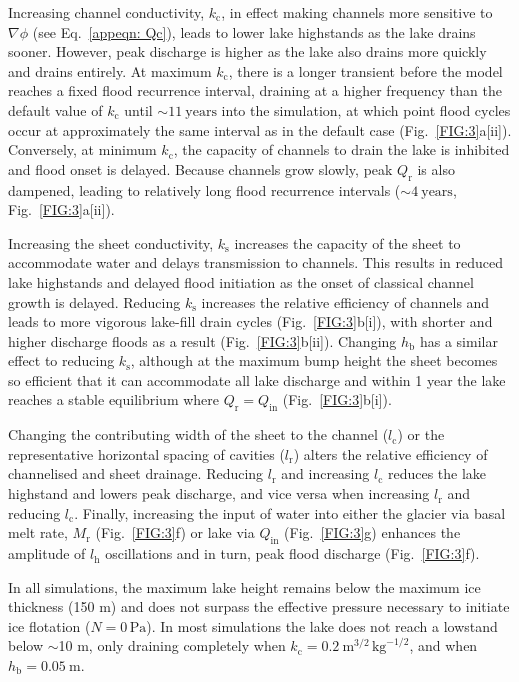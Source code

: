 \documentclass[tc, manuscript]{copernicus}
\begin{document}
Increasing channel conductivity, $k_{\mathrm{c}}$, in effect making channels more sensitive to $\nabla \phi$ (see Eq.~\ref{appeqn: Qc}), leads to lower lake highstands as the lake drains sooner. However, peak discharge is higher as the lake also drains more quickly and drains entirely. At maximum $k_{\mathrm{c}}$, there is a longer transient before the model reaches a fixed flood recurrence interval, draining at a higher frequency than the default value of $k_{\mathrm{c}}$ until $\sim 11 \ \mathrm{years}$ into the simulation, at which point flood cycles occur at approximately the same interval as in the default case (Fig.~\ref{FIG:3}a[ii]). Conversely, at minimum $k_{\mathrm{c}}$, the capacity of channels to drain the lake is inhibited and flood onset is delayed. Because channels grow slowly, peak $Q_{\mathrm{r}}$ is also dampened, leading to relatively long flood recurrence intervals ($\sim 4\ \mathrm{years}$, Fig.~\ref{FIG:3}a[ii]).

Increasing the sheet conductivity, $k_{\mathrm{s}}$ increases the capacity of the sheet to accommodate water and delays transmission to channels. This results in reduced lake highstands and delayed flood initiation as the onset of classical channel growth is delayed. Reducing $k_{\mathrm{s}}$ increases the relative efficiency of channels and leads to more vigorous lake-fill drain cycles (Fig.~\ref{FIG:3}b[i]), with shorter and higher discharge floods as a result (Fig.~\ref{FIG:3}b[ii]). Changing $h_{\mathrm{b}}$ has a similar effect to reducing $k_{\mathrm{s}}$, although at the maximum bump height the sheet becomes so efficient that it can accommodate all lake discharge and within 1 year the lake reaches a stable equilibrium where $Q_{\mathrm{r}} = Q_{\mathrm{in}}$ (Fig.~\ref{FIG:3}b[i]). 

Changing the contributing width of the sheet to the channel ($l_{\mathrm{c}}$) or the representative horizontal spacing of cavities ($l_{\mathrm{r}}$) alters the relative efficiency of channelised and sheet drainage. Reducing $l_{\mathrm{r}}$ and increasing $l_{\mathrm{c}}$ reduces the lake highstand and lowers peak discharge, and vice versa when increasing $l_{\mathrm{r}}$ and reducing $l_{\mathrm{c}}$. Finally, increasing the input of water into either the glacier via basal melt rate, $M_{\mathrm{r}}$ (Fig.~\ref{FIG:3}f) or lake via $Q_{\mathrm{in}}$ (Fig.~\ref{FIG:3}g) enhances the amplitude of $l_{\mathrm{h}}$ oscillations and in turn, peak flood discharge (Fig.~\ref{FIG:3}f). 

In all simulations, the maximum lake height remains below the maximum ice thickness (150 m) and does not surpass the effective pressure necessary to initiate ice flotation ($N=0\, \mathrm{Pa}$). In most simulations the lake does not reach a lowstand below $\sim$10 m, only draining completely when $k_{\mathrm{c}} = 0.2 \ \mathrm{m}^{3/2}\, \mathrm{kg}^{-1/2}$, and when $h_{\mathrm{b}}=0.05\ \mathrm{m}$.
\end{document}
